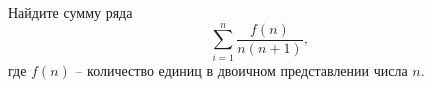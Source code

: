\documentclass{article}
\begin{document}
Найдите сумму ряда
$$\sum_{i=1}^n \frac{f(n)}{n(n+1)},$$
где $f(n)$ -- количество единиц в двоичном представлении числа $n$.
\end{document}
